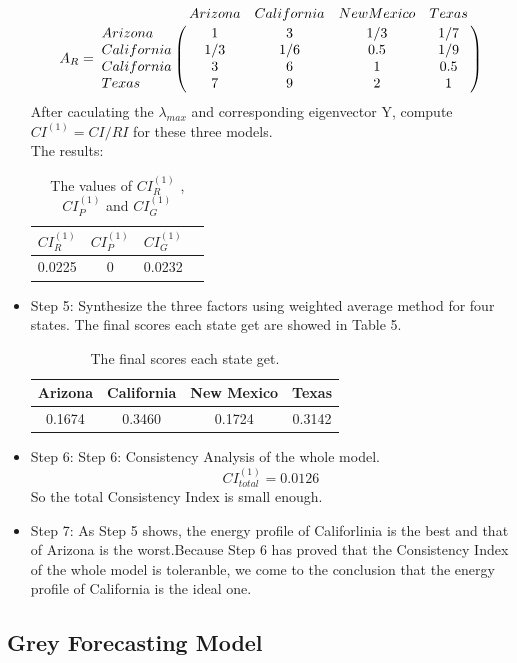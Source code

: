\documentclass{mcmthesis}
\begin{document}
\begin{itemize}
    			$$
				A_R = \bordermatrix{
					& Arizona & California & New Mexico & Texas  \cr
				Arizona &   1 & 3 & 1/3 & 1/7\cr
				California &   1/3 & 1/6 & 0.5 & 1/9\cr
				California & 3  & 6 & 1 & 0.5\cr
				Texas & 7 & 9 & 2 & 1
					}
				$$
	After caculating the $\lambda_{max}$ and corresponding eigenvector Y, compute $CI^{(1)} = CI/RI$ for these three models.\\
	The results:
    \begin{table}[!h]
  	\centering
	\begin{tabular}{cccc}
	\toprule  %
    $CI^{(1)}_R$ & $CI^{(1)}_P$ & $CI^{(1)}_G$\\
	\midrule  %
	0.0225 & 0 & 0.0232\\
	\bottomrule %
	\end{tabular}
	\caption{The values of $CI^{(1)}_R$ , $CI^{(1)}_P$ and $CI^{(1)}_G$}
	\end{table}
	\item Step 5:
 	Synthesize the three factors using weighted average method for four states.
 	The final scores each state get are showed in Table 5.
	\begin{table}[!h]
  	\centering
  	\begin{tabular}{cccc}
	\toprule  %
    Arizona & California & New Mexico & Texas\\
	\midrule  %
	0.1674 & 0.3460 & 0.1724 & 0.3142\\
	\bottomrule %
	\end{tabular}
	\caption{The final scores each state get.}
	\end{table}
	\item Step 6: Step 6: Consistency Analysis of the whole model.
	$$
 		CI_{total}^{(1)} = 0.0126
 	$$
 	So the total Consistency Index is small enough.
 	\item Step 7: As Step 5 shows, the energy profile of Califorlinia is the best and that of Arizona is the worst.Because Step 6 has proved that the Consistency Index of the whole model is toleranble, we come to the conclusion that the energy profile of California is the ideal one.
 	
  \end{itemize}

\subsection{Grey Forecasting Model}
\end{document}
